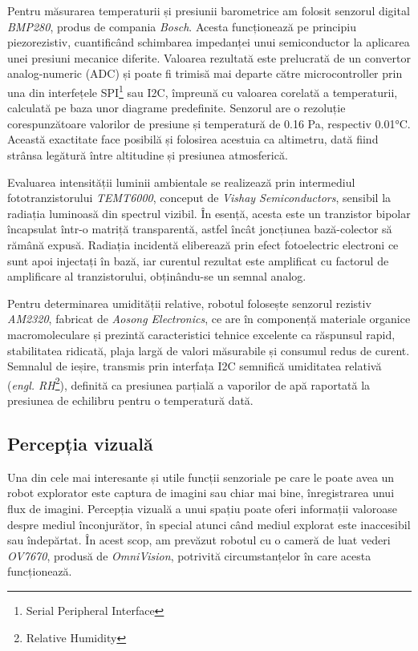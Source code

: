 Pentru măsurarea temperaturii și presiunii barometrice am folosit senzorul digital \textit{BMP280}, produs de compania \textit{Bosch}. Acesta funcționează pe principiu \mbox{piezorezistiv}, cuantificând schimbarea impedanței unui semiconductor la aplicarea unei presiuni mecanice diferite. Valoarea rezultată este prelucrată de un convertor analog-numeric (ADC) și poate fi trimisă mai departe către microcontroller prin una din interfețele SPI\footnote{Serial Peripheral Interface} sau  I2C, împreună cu valoarea corelată a temperaturii, calculată pe baza unor diagrame predefinite. Senzorul are o rezoluție corespunzătoare valorilor de presiune și temperatură de 0.16 Pa, respectiv 0.01°C. Această exactitate face posibilă și folosirea acestuia ca altimetru, dată fiind strânsa legătură între altitudine și presiunea atmosferică.

Evaluarea intensității luminii ambientale se realizează prin intermediul fototranzistorului \textit{TEMT6000}, conceput de \textit{Vishay Semiconductors}, sensibil la radiația luminoasă din spectrul vizibil. În esență, acesta este un tranzistor bipolar încapsulat într-o matriță transparentă, astfel încât joncțiunea bază-colector să rămână expusă. Radiația incidentă eliberează prin efect fotoelectric electroni ce sunt apoi injectați în bază, iar curentul rezultat este amplificat cu factorul de amplificare al tranzistorului, obținându-se un semnal analog.

Pentru determinarea umidității relative, robotul folosește senzorul rezistiv \textit{AM2320}, fabricat de \textit{Aosong Electronics}, ce are în componență materiale organice macromoleculare și prezintă caracteristici tehnice excelente ca răspunsul rapid, stabilitatea ridicată, plaja largă de valori măsurabile și consumul redus de curent. Semnalul de ieșire, transmis prin interfața I2C semnifică umiditatea relativă (\textit{engl. RH}\footnote{Relative Humidity}), definită ca presiunea parțială a vaporilor de apă raportată la presiunea de echilibru pentru o temperatură dată.

\subsection{Percepția vizuală}

Una din cele mai interesante și utile funcții senzoriale pe care le poate avea un robot explorator este captura de imagini sau chiar mai bine, înregistrarea unui flux de imagini. Percepția vizuală a unui spațiu poate oferi informații valoroase despre mediul înconjurător, în special atunci când mediul explorat este inaccesibil sau îndepărtat. În acest scop, am prevăzut robotul cu o cameră de luat vederi \textit{OV7670}, produsă de \textit{OmniVision}, potrivită circumstanțelor în care acesta funcționează.

